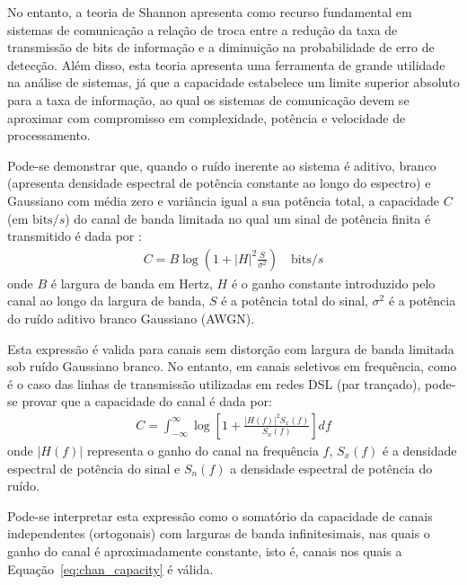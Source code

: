 No entanto, a teoria de Shannon apresenta como recurso fundamental em sistemas de comunicação a relação de troca entre a redução da taxa de transmissão de bits de informação e a diminuição na probabilidade de erro de detecção. Além disso, esta teoria apresenta uma ferramenta de grande utilidade na análise de sistemas, já que a capacidade estabelece um limite superior absoluto para a taxa de informação, ao qual os sistemas de comunicação devem se aproximar com compromisso em complexidade, potência e velocidade de processamento.

Pode-se demonstrar  que, quando o ruído inerente ao sistema é aditivo, branco (apresenta densidade espectral de potência constante ao longo do espectro) e Gaussiano com média zero e variância igual a sua potência total, a capacidade $C$ (em $\text{bits}/s$) do canal de banda limitada no qual um sinal de potência finita é transmitido é dada por \cite{lathi2009}:
\begin{align}
C = B\log \left( 1 + \left|H\right|^2\frac{S}{\sigma^2} \right) \quad \text{bits}/s
\label{eq:chan_capacity}
\end{align}
onde $B$ é largura de banda em Hertz, $H$ é o ganho constante introduzido pelo canal ao longo da largura de banda, $S$ é a potência total do sinal, $\sigma^2$ é a potência do ruído aditivo branco Gaussiano (AWGN).

Esta expressão é valida para canais sem distorção com largura de banda limitada sob ruído Gaussiano branco. No entanto, em canais seletivos em frequência, como é o caso das linhas de transmissão utilizadas em redes DSL (par trançado), pode-se provar que a capacidade do canal é dada por:
\begin{align}
C = \int_{- \infty}^{\infty} \log \left[ 1 + \frac{\left| H(f) \right|^2 S_x(f)}{S_n(f)} \right] df 
\label{eq:chan_capacity_cont}
\end{align}
onde $\left| H(f) \right|$ representa o ganho do canal na frequência $f$, $S_x(f)$ é a densidade espectral de potência do sinal e $S_n(f)$ a densidade espectral de potência do ruído.

Pode-se interpretar esta expressão como o somatório da capacidade de canais independentes (ortogonais) com larguras de banda infinitesimais, nas quais o ganho do canal é aproximadamente constante, isto é, canais nos quais a Equação~\ref{eq:chan_capacity} é válida.

